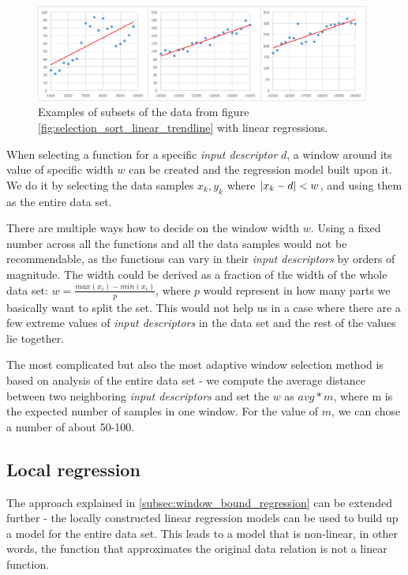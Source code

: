 \begin{figure}[h!]
	\captionsetup{justification=centering,margin=0.5cm}
	\centerline{\mbox{\includegraphics[width=110mm]{./img/window_examples.png}}}
	\caption{Examples of subsets of the data from figure \ref{fig:selection_sort_linear_trendline} with linear regressions.}
	\label{fig:window_examples}
\end{figure}

When selecting a function for a specific \textit{input descriptor} $d$, a window around its value of specific width $w$ can be created and the regression model built upon it. We do it by selecting the data samples $x_k, y_k$ where $\left|{x_k - d}\right| < w$, and using them as the entire data set.

There are multiple ways how to decide on the window width $w$. Using a fixed number across all the functions and all the data samples would not be recommendable, as the functions can vary in their \textit{input descriptors} by orders of magnitude. The width could be derived as a fraction of the width of the whole data set: $w = \frac{max(x_i) - min(x_i)}{p}$, where $p$ would represent in how many parts we basically want to split the set. This would not help us in a case where there are a few extreme values of \textit{input descriptors} in the data set and the rest of the values lie together. 

The most complicated but also the most adaptive window selection method is based on analysis of the entire data set - we compute the average distance between two neighboring \textit{input descriptors} and set the $w$ as $avg * m$, where m is the expected number of samples in one window. For the value of $m$, we can chose a number of about 50-100.

\subsection{Local regression}
\label{subsec:local_regression}

The approach explained in \ref{subsec:window_bound_regression} can be extended further - the locally constructed linear regression models can be used to build up a model for the entire data set. This leads to a model that is non-linear, in other words, the function that approximates the original data relation is not a linear function.

